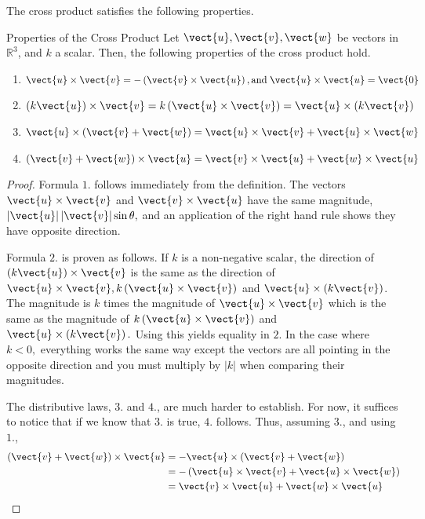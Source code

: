 The cross product satisfies the following properties.

\begin{proposition}{Properties of the Cross Product}\label{prop:propertiescrossproduct}
Let $\vect{u}, \vect{v}, \vect{w}$ be vectors in $\mathbb{R}^3$, and $k$ a scalar. Then, the following properties 
of the cross product hold.
\begin{enumerate}
\item 
$\vect{u}\times \vect{v}= -\left( \vect{v}\times \vect{u}\right), 
\mbox{and} \; \vect{u}\times \vect{u}=\vect{0}$
\item 
$\left( k \vect{u}\right)\times \vect{v}= k \left( \vect{u}\times \vect{v}\right) 
=\vect{u}\times \left( k \vect{v}\right)$
\item
$\vect{u}\times \left( \vect{v}+\vect{w}\right) =\vect{u}\times \vect{v}+\vect{u}\times \vect{w}$
\item 
$\left( \vect{v}+\vect{w}\right) \times \vect{u}=\vect{v} \times \vect{u}+\vect{w}\times \vect{u}$
\end{enumerate}
\end{proposition}

\begin{proof}
Formula $1.$ follows immediately from the definition. The vectors 
$\vect{u}\times \vect{v}$ and $\vect{v}\times \vect{u}$ have the same magnitude, 
$\left\vert \vect{u}\right\vert \left\vert \vect{v}\right\vert \sin
\theta ,$ and an application of the right hand rule shows they have opposite
direction. 

Formula $2.$ is proven as follows. If $k $ is a
non-negative scalar, the direction of $\left( k \vect{u}\right)
\times \vect{v}$ is the same as the direction of $\vect{u}\times \vect{v},
k \left( \vect{u}\times \vect{v}\right) $ and $\vect{u}\times \left(
k \vect{v}\right) $. The magnitude is  $k$ times the
magnitude of $\vect{u}\times \vect{v}$ which is the same as the magnitude of 
$k \left( \vect{u}\times \vect{v}\right) $ and $\vect{u}\times \left(
k \vect{v}\right) .$ Using this yields equality in $2$. In
the case where $k <0,$ everything works the same way except the vectors
are all pointing in the opposite direction and you must multiply by 
$\left\vert k \right\vert $ when comparing their magnitudes. 

The distributive laws, $3.$ and $4.$, are much harder to establish. For now, it suffices to
 notice that if we know that $3.$ is true, $4.$ follows. Thus, assuming $3.$, and using $1.$,
\begin{align*}
\left( \vect{v}+\vect{w}\right) \times \vect{u}& =-\vect{u}\times \left(
\vect{v}+\vect{w}\right) \\
& =-\left( \vect{u}\times \vect{v}+\vect{u}\times \vect{w}\right) \\
& =\vect{v}\times \vect{u}+\vect{w}\times \vect{u}
\end{align*}
\end{proof}

